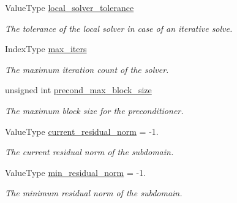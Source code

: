 \begin{DoxyCompactItemize}
Value\+Type \hyperlink{structschwz_1_1Metadata_a0fec5924fa99f07cabf560cc461887b5}{local\+\_\+solver\+\_\+tolerance}
\begin{DoxyCompactList}\small\item\em The tolerance of the local solver in case of an iterative solve. \end{DoxyCompactList}\item 
\mbox{\label{structschwz_1_1Metadata_aa3fbf70891e008cf810b6480be6607da}} 
Index\+Type \hyperlink{structschwz_1_1Metadata_aa3fbf70891e008cf810b6480be6607da}{max\+\_\+iters}
\begin{DoxyCompactList}\small\item\em The maximum iteration count of the solver. \end{DoxyCompactList}\item 
\mbox{\label{structschwz_1_1Metadata_a93978e9e4d28fac4ee80fdb5c77a7074}} 
unsigned int \hyperlink{structschwz_1_1Metadata_a93978e9e4d28fac4ee80fdb5c77a7074}{precond\+\_\+max\+\_\+block\+\_\+size}
\begin{DoxyCompactList}\small\item\em The maximum block size for the preconditioner. \end{DoxyCompactList}\item 
\mbox{\label{structschwz_1_1Metadata_a3436901bfcd4f17f65ed3acb810a7909}} 
Value\+Type \hyperlink{structschwz_1_1Metadata_a3436901bfcd4f17f65ed3acb810a7909}{current\+\_\+residual\+\_\+norm} = -\/1.
\begin{DoxyCompactList}\small\item\em The current residual norm of the subdomain. \end{DoxyCompactList}\item 
\mbox{\label{structschwz_1_1Metadata_a04bd75fb60c4085481a3fc3e96269452}} 
Value\+Type \hyperlink{structschwz_1_1Metadata_a04bd75fb60c4085481a3fc3e96269452}{min\+\_\+residual\+\_\+norm} = -\/1.
\begin{DoxyCompactList}\small\item\em The minimum residual norm of the subdomain. \end{DoxyCompactList}\item 
\mbox{\label{structschwz_1_1Metadata_a50bb2b3dc28c0eabbd423a069e560951}} 

\end{DoxyCompactItemize}
